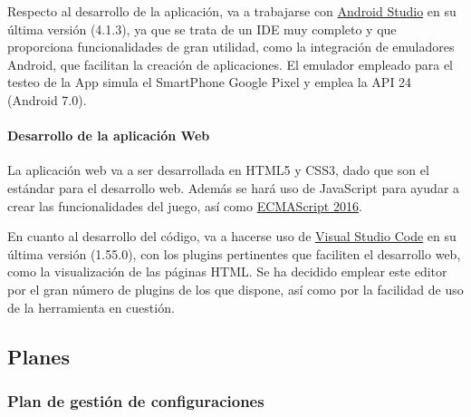 \documentclass{article}
\begin{document}
Respecto al desarrollo de la aplicación, va a trabajarse con \href{https://developer.android.com/studio}{Android Studio} en su última versión (4.1.3), ya que se trata de un IDE muy completo y que proporciona funcionalidades de gran utilidad, como la integración de emuladores Android, que facilitan la creación de aplicaciones. El emulador empleado para el testeo de la App simula el SmartPhone Google Pixel y emplea la API 24 (Android 7.0).

\paragraph*{Desarrollo de la aplicación Web}
La aplicación web va a ser desarrollada en HTML5 y CSS3, dado que son el estándar para el desarrollo web. Además se hará uso de JavaScript para ayudar a crear las funcionalidades del juego, así como \href{https://262.ecma-international.org/7.0/}{ECMAScript 2016}.

En cuanto al desarrollo del código, va a hacerse uso de \href{https://code.visualstudio.com/Download}{Visual Studio Code} en su última versión (1.55.0), con los plugins pertinentes que faciliten el desarrollo web, como la visualización de las páginas HTML. Se ha decidido emplear este editor por el gran número de plugins de los que dispone, así como por la facilidad de uso de la herramienta en cuestión.

\subsection{Planes}

\subsubsection{Plan de gestión de configuraciones}


\end{document}
